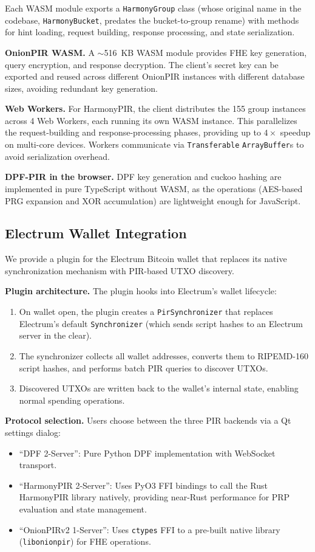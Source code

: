 Each WASM module exports a \texttt{HarmonyGroup} class (whose original name in the codebase, \texttt{HarmonyBucket}, predates the bucket-to-group rename) with methods for hint loading, request building, response processing, and state serialization.

\textbf{OnionPIR WASM.} A $\sim$516~KB WASM module provides FHE key generation, query encryption, and response decryption. The client's secret key can be exported and reused across different OnionPIR instances with different database sizes, avoiding redundant key generation.

\textbf{Web Workers.} For HarmonyPIR, the client distributes the 155 group instances across 4 Web Workers, each running its own WASM instance. This parallelizes the request-building and response-processing phases, providing up to $4\times$ speedup on multi-core devices. Workers communicate via \texttt{Transferable} \texttt{ArrayBuffer}s to avoid serialization overhead.

\textbf{DPF-PIR in the browser.} DPF key generation and cuckoo hashing are implemented in pure TypeScript without WASM, as the operations (AES-based PRG expansion and XOR accumulation) are lightweight enough for JavaScript.

\subsection{Electrum Wallet Integration}

We provide a plugin for the Electrum Bitcoin wallet \cite{electrum} that replaces its native synchronization mechanism with PIR-based UTXO discovery.

\textbf{Plugin architecture.} The plugin hooks into Electrum's wallet lifecycle:
\begin{enumerate}[nolistsep,leftmargin=*]
    \item On wallet open, the plugin creates a \texttt{PirSynchronizer} that replaces Electrum's default \texttt{Synchronizer} (which sends script hashes to an Electrum server in the clear).
    \item The synchronizer collects all wallet addresses, converts them to RIPEMD-160 script hashes, and performs batch PIR queries to discover UTXOs.
    \item Discovered UTXOs are written back to the wallet's internal state, enabling normal spending operations.
\end{enumerate}

\textbf{Protocol selection.} Users choose between the three PIR backends via a Qt settings dialog:
\begin{itemize}[nolistsep,leftmargin=*]
    \item ``DPF 2-Server'': Pure Python DPF implementation with WebSocket transport.
    \item ``HarmonyPIR 2-Server'': Uses PyO3 FFI bindings to call the Rust HarmonyPIR library natively, providing near-Rust performance for PRP evaluation and state management.
    \item ``OnionPIRv2 1-Server'': Uses \texttt{ctypes} FFI to a pre-built native library (\texttt{libonionpir}) for FHE operations.
\end{itemize}

